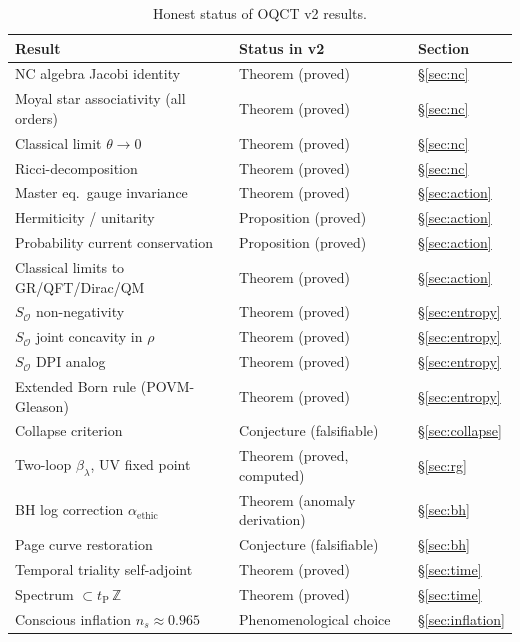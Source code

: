\documentclass[11pt,a4paper]{article}
\theoremstyle{myrmk}
\newcommand{\tP}{t_{\mathrm{P}}}
\begin{document}
\begin{table}[H]
\centering\small
\caption{Honest status of OQCT v2 results.}
\label{tab:status}
\renewcommand{\arraystretch}{1.22}
\begin{tabular}{lll}
\toprule
\textbf{Result} & \textbf{Status in v2} & \textbf{Section} \\ \midrule
NC algebra Jacobi identity                  & Theorem (proved)              & \S\ref{sec:nc} \\
Moyal star associativity (all orders)       & Theorem (proved)              & \S\ref{sec:nc} \\
Classical limit $\theta\to 0$               & Theorem (proved)              & \S\ref{sec:nc} \\
Ricci-decomposition                         & Theorem (proved)              & \S\ref{sec:nc} \\
Master eq.\ gauge invariance                & Theorem (proved)              & \S\ref{sec:action} \\
Hermiticity / unitarity                     & Proposition (proved)          & \S\ref{sec:action} \\
Probability current conservation            & Proposition (proved)          & \S\ref{sec:action} \\
Classical limits to GR/QFT/Dirac/QM         & Theorem (proved)              & \S\ref{sec:action} \\
$S_{\mathcal{O}}$ non-negativity            & Theorem (proved)              & \S\ref{sec:entropy} \\
$S_{\mathcal{O}}$ joint concavity in $\rho$ & Theorem (proved)              & \S\ref{sec:entropy} \\
$S_{\mathcal{O}}$ DPI analog                & Theorem (proved)              & \S\ref{sec:entropy} \\
Extended Born rule (POVM-Gleason)           & Theorem (proved)              & \S\ref{sec:entropy} \\
Collapse criterion                          & Conjecture (falsifiable)      & \S\ref{sec:collapse} \\
Two-loop $\beta_\lambda$, UV fixed point    & Theorem (proved, computed)    & \S\ref{sec:rg} \\
BH log correction $\alpha_{\mathrm{ethic}}$ & Theorem (anomaly derivation)  & \S\ref{sec:bh} \\
Page curve restoration                      & Conjecture (falsifiable)      & \S\ref{sec:bh} \\
Temporal triality self-adjoint              & Theorem (proved)              & \S\ref{sec:time} \\
Spectrum $\subset \tP\,\mathbb{Z}$          & Theorem (proved)              & \S\ref{sec:time} \\
Conscious inflation $n_s\approx 0.965$      & Phenomenological choice       & \S\ref{sec:inflation} \\
\bottomrule
\end{tabular}
\end{table}
\end{document}
